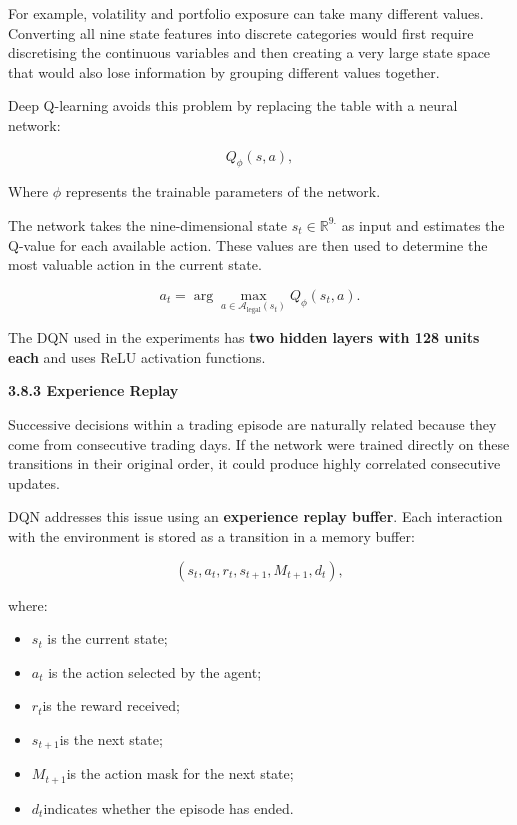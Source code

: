 For example, volatility and portfolio exposure can take many different
values. Converting all nine state features into discrete categories
would first require discretising the continuous variables and then
creating a very large state space that would also lose information by
grouping different values together.

Deep Q-learning avoids this problem by replacing the table with a neural
network:

\[Q_{\phi}(s,a),\]

Where \(\phi\) represents the trainable parameters of the network.

The network takes the nine-dimensional state
\(s_{t} \in \mathbb{R}^{9.}\) as input and estimates the Q-value for
each available action. These values are then used to determine the most
valuable action in the current state.

\[a_{t} = \arg{\max_{a \in \mathcal{A}_{\text{legal}}\left( s_{t} \right)}{Q_{\phi}\left( s_{t},a \right)}}.\]

The DQN used in the experiments has \textbf{two hidden layers with 128
units each} and uses ReLU activation functions.

\textbf{3.8.3 Experience Replay}

Successive decisions within a trading episode are naturally related
because they come from consecutive trading days. If the network were
trained directly on these transitions in their original order, it could
produce highly correlated consecutive updates.

DQN addresses this issue using an \textbf{experience replay buffer}.
Each interaction with the environment is stored as a transition in a
memory buffer:

\[\left( s_{t},a_{t},r_{t},s_{t + 1},M_{t + 1},d_{t} \right),\]

where:

\begin{itemize}
\item
  \(s_{t}\) is the current state;
\item
  \(a_{t}\) is the action selected by the agent;
\item
  \(r_{t}\)is the reward received;
\item
  \(s_{t + 1}\)is the next state;
\item
  \(M_{t + 1}\)is the action mask for the next state;
\item
  \(d_{t}\)indicates whether the episode has ended.
\end{itemize}

